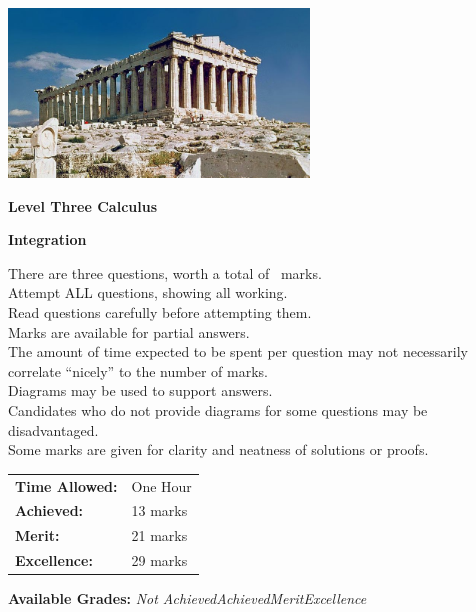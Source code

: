 \documentclass[a4paper,addpoints]{exam}
\begin{document}
\begin{coverpages}

\begin{center}
  \includegraphics[width=0.6\textwidth]{exam-cover-04}

  \vspace{5mm}

  \textbf{\Huge{Level Three Calculus}}

  \vspace{2mm}

  \textbf{\Huge{Integration}}
\end{center}

\vspace{5mm}

\noindent
\large{There are three questions, worth a total of \numpoints\ marks.\\
       Attempt ALL questions, showing all working.\\
       Read questions carefully before attempting them.\\
       Marks are available for partial answers.\\
       The amount of time expected to be spent per question may not necessarily correlate ``nicely'' to the number of marks.\\
       Diagrams may be used to support answers.\\
       Candidates who do not provide diagrams for some questions may be disadvantaged.\\
       Some marks are given for clarity and neatness of solutions or proofs.}
\vspace{2mm}

\begin{tabular}{ll}
  \textbf{Time Allowed:}& One Hour\\
  \textbf{Achieved:}& 13 marks\\
  \textbf{Merit:}& 21 marks\\
  \textbf{Excellence:}& 29 marks
\end{tabular}

\vfill

\begin{center}
  \gradetable[h][questions]
  \vspace{2mm}

  \textbf{Available Grades:} \textit{Not Achieved}\quad\textit{Achieved}\quad\textit{Merit}\quad\textit{Excellence}
\end{center}

\end{coverpages}
\end{document}
